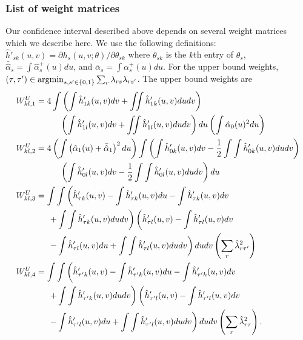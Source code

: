 \documentclass[12pt]{article}
\theoremstyle{definition}
\newcommand{\argmin}{\operatornamewithlimits{argmin}}
\begin{document}
{\subsubsection{List of weight matrices}
Our confidence interval described above depends on several weight matrices which we describe here. We use the following definitions: $\hat{h}'_{s k}(u,v) = \partial h_s(u,v;\theta)/\partial \theta_{sk}$ where $\theta_{sk}$ is the $k$th entry of $\theta_s$, $\bar{\hat{\alpha}}_{s} = \int\hat{\alpha}_s^{+}(u)du$, and $\bar{\alpha}_{s} = \int\alpha_s^{+}(u)du$. For the upper bound weights, $(\tau, \tau') \in \argmin_{s,s' \in \{0,1\}}\sum_r \lambda_{rs}\lambda_{rs'}$. The upper bound weights are  
\begin{align*}
W^{U}_{kl,1} &= 4\int \left(\int \hat{h}'_{1k}(u,v)dv + \iint \hat{h}'_{1 k}(u,v)dudv\right) \\
&\hspace{10mm}\left(\int \hat{h}'_{1 l}(u,v)dv + \iint \hat{h}'_{1 l}(u,v)dudv\right)du \left(\int \hat{\alpha}_0(u)^{2}du\right) \\
W^{U}_{kl,2} &= 4\left( \int \left( \hat{\alpha}_1(u) + \bar{\hat{\alpha}}_1\right)^2du\right) \int \left(\int \hat{h}'_{0k}(u,v)dv - \frac{1}{2}\int\int \hat{h}'_{0k}(u,v)dudv\right) \\
&\hspace{10mm}\left(\int \hat{h}'_{0l}(u,v)dv - \frac{1}{2}\int\int \hat{h}'_{0l}(u,v)dudv\right)du \\
W^{U}_{kl,3} &= \int\int\left(\hat{h}'_{\tau k}(u,v) - \int\hat{h}'_{\tau k}(u,v)du  - \int\hat{h}'_{\tau k}(u,v)dv\right. \\
&\hspace{5mm}\left.+ \int\int\hat{h}'_{\tau k}(u,v)dudv\right)\left(\hat{h}'_{\tau l}(u,v) - \int\hat{h}'_{\tau l}(u,v)dv \right. \\
&\hspace{5mm}\left.- \int\hat{h}'_{\tau l}(u,v)du  + \int\int\hat{h}'_{\tau l}(u,v)dudv\right)dudv \left(\sum_{r} \hat{\lambda}_{r\tau'}^{2}\right) \\
W^{U}_{kl,4} &= \int\int\left(\hat{h}'_{\tau' k}(u,v) - \int\hat{h}'_{\tau' k}(u,v)du  - \int\hat{h}'_{\tau' k}(u,v)dv\right. \\
&\hspace{5mm}\left.+ \int\int\hat{h}'_{\tau' k}(u,v)dudv\right)\left(\hat{h}'_{\tau' l}(u,v) - \int\hat{h}'_{\tau' l}(u,v)dv \right. \\
&\hspace{5mm}\left.- \int\hat{h}'_{\tau' l}(u,v)du  + \int\int\hat{h}'_{\tau' l}(u,v)dudv\right)dudv \left(\sum_{r} \hat{\lambda}_{r\tau}^{2}\right). 

\end{align*}}
\end{document}
